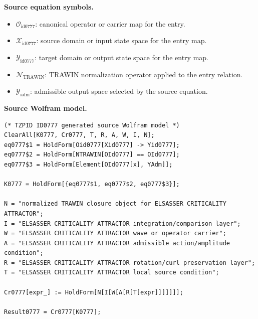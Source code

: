 \begin{minipage}[t]{0.49\linewidth}
\begingroup
\small
\raggedright
\textbf{Source equation symbols.}\par
\begin{itemize}[leftmargin=1.35em,itemsep=1pt,topsep=1pt,parsep=0pt]
    \item $\mathcal{O}_{\mathrm{id0777}}$: canonical operator or carrier map for the entry.
    \item $\mathcal{X}_{\mathrm{id0777}}$: source domain or input state space for the entry map.
    \item $\mathcal{Y}_{\mathrm{id0777}}$: target domain or output state space for the entry map.
    \item $\mathcal{N}_{\mathrm{TRAWIN}}$: TRAWIN normalization operator applied to the entry relation.
    \item $\mathcal{Y}_{\mathrm{adm}}$: admissible output space selected by the source equation.
\end{itemize}
\endgroup
\end{minipage}\hfill
\begin{minipage}[t]{0.47\linewidth}
\begingroup
\scriptsize
\raggedright
\textbf{Source Wolfram model.}\par
\begin{Verbatim}[fontsize=\tiny,breaklines=true,breakanywhere=true]
(* TZPID ID0777 generated source Wolfram model *)
ClearAll[K0777, Cr0777, T, R, A, W, I, N];
eq0777$1 = HoldForm[Oid0777[Xid0777] -> Yid0777];
eq0777$2 = HoldForm[NTRAWIN[OId0777] == OId0777];
eq0777$3 = HoldForm[Element[OId0777[x], YAdm]];

K0777 = HoldForm[{eq0777$1, eq0777$2, eq0777$3}];

N = "normalized TRAWIN closure object for ELSASSER CRITICALITY ATTRACTOR";
I = "ELSASSER CRITICALITY ATTRACTOR integration/comparison layer";
W = "ELSASSER CRITICALITY ATTRACTOR wave or operator carrier";
A = "ELSASSER CRITICALITY ATTRACTOR admissible action/amplitude condition";
R = "ELSASSER CRITICALITY ATTRACTOR rotation/curl preservation layer";
T = "ELSASSER CRITICALITY ATTRACTOR local source condition";

Cr0777[expr_] := HoldForm[N[I[W[A[R[T[expr]]]]]]];

Result0777 = Cr0777[K0777];
\end{Verbatim}
\endgroup
\end{minipage}

